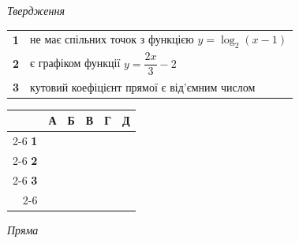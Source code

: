 \documentclass[14pt]{extarticle}
\newcommand{\answerGrid}{
    \begingroup
    \renewcommand{\arraystretch}{1.3} 
    \setlength{\tabcolsep}{7pt} 
    \begin{tabular}{r|c|c|c|c|c|}
         \multicolumn{1}{c}{} & \multicolumn{1}{c}{\textbf{А}} & \multicolumn{1}{c}{\textbf{Б}} & \multicolumn{1}{c}{\textbf{В}} & \multicolumn{1}{c}{\textbf{Г}} & \multicolumn{1}{c}{\textbf{Д}} \\ \cline{2-6}
         \textbf{1} & & & & & \\ \cline{2-6}
         \textbf{2} & & & & & \\ \cline{2-6}
         \textbf{3} & & & & & \\ \cline{2-6}
    \end{tabular}
    \endgroup
}
\begin{document}
\vspace{0.3cm}

\noindent
\begin{minipage}[t]{0.60\textwidth}
    \textit{Твердження} \par \vspace{0.2cm}
    \begin{tabular}{@{}p{0.4cm} p{9cm}@{}}
    \textbf{1} & не має спільних точок з функцією $y=\log_2(x-1)$ \\[0.4cm]
    \textbf{2} & є графіком функції $y=\dfrac{2x}{3}-2$ \\[0.4cm]
    \textbf{3} & кутовий коефіцієнт прямої є від'ємним числом \\
    \end{tabular}
\end{minipage}%
\hfill
\begin{minipage}[t]{0.30\textwidth}
    \vspace{0.5cm}
    \answerGrid
\end{minipage}

\vspace{0.5cm}
\textit{Пряма} \par \vspace{0.2cm}
\end{document}
